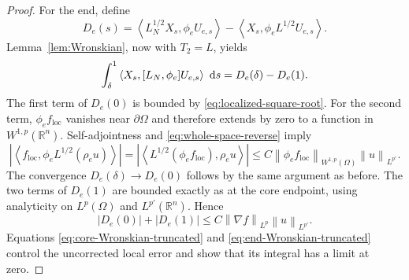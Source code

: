 \documentclass[12pt]{amsart}
\newcommand\R{\mathbb{R}}
\newcommand\dd{\,{\rm d}}
\newcommand{\ip}[2]{\left\langle #1,#2\right\rangle}
\newcommand{\norm}[2]{\left\lVert #1\right\rVert_{#2}}
\newcommand{\abs}[1]{\left\lvert #1\right\rvert}
\theoremstyle{remark}
\begin{document}
\begin{proof}
For the end, define
\[
 D_e(s)=\ip{L_N^{1/2}X_s}{\phi_eU_{e,s}}
       -\ip{X_s}{\phi_eL^{1/2}U_{e,s}}.
\]
Lemma~\ref{lem:Wronskian}, now with $T_2=L$, yields
\begin{equation}\label{eq:end-Wronskian-truncated}
 \int_\delta^1\ip{X_s}{[L_N,\phi_e]U_{e,s}}\,\dd s
 =D_e(\delta)-D_e(1).
\end{equation}
The first term of $D_e(0)$ is bounded by
\eqref{eq:localized-square-root}.  For the second term, $\phi_ef_{\mathrm{loc}}$
vanishes near $\partial\Omega$ and therefore extends by zero to a function
in $W^{1,p}(\R^n)$.  Self-adjointness and
\eqref{eq:whole-space-reverse} imply
\[
 \abs{\ip{f_{\mathrm{loc}}}{\phi_eL^{1/2}(\rho_eu)}}
 =\abs{\ip{L^{1/2}(\phi_ef_{\mathrm{loc}})}{\rho_eu}}
 \leq C\norm{\phi_ef_{\mathrm{loc}}}{W^{1,p}(\Omega)}
          \norm u{L^{p'}}.
\]
The convergence $D_e(\delta)\to D_e(0)$ follows by the same argument as
before.  The two terms of $D_e(1)$ are bounded
exactly as at the core endpoint, using
analyticity on $L^p(\Omega)$ and $L^{p'}(\R^n)$.  Hence
\[
 \abs{D_e(0)}+\abs{D_e(1)}
 \leq C\norm{\nabla f}{L^p}\norm u{L^{p'}}.
\]
Equations \eqref{eq:core-Wronskian-truncated} and
\eqref{eq:end-Wronskian-truncated} control the uncorrected local error and
show that its integral has a limit at zero.


\end{proof}
\end{document}
